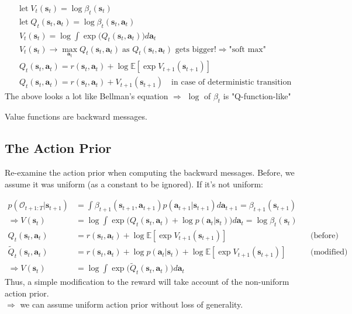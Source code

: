 \begin{align*}
	&\text{let}\; V_t(\textbf{s}_t) = \log \beta_t(\textbf{s}_t)\\
	&\text{let}\; Q_t(\textbf{s}_t, \textbf{a}_t) = \log \beta_t(\textbf{s}_t, \textbf{a}_t)\\
	&V_t(\textbf{s}_t) = \log \int \exp \big( Q_t(\textbf{s}_t, \textbf{a}_t) \big) d\textbf{a}_t\\
	&V_t(\textbf{s}_t) \rightarrow \underset{\textbf{a}_t}{\max} Q_t(\textbf{s}_t, \textbf{a}_t) \; \text{as $Q_t(\textbf{s}_t, \textbf{a}_t)$ gets bigger!} \Rightarrow \text{"soft max"}\\
	&Q_t(\textbf{s}_t, \textbf{a}_t) = r(\textbf{s}_t, \textbf{a}_t) + \log \mathbb{E} [\exp V_{t+1}(\textbf{s}_{t+1})]\\
	&Q_t(\textbf{s}_t, \textbf{a}_t) = r(\textbf{s}_t, \textbf{a}_t) + V_{t+1}(\textbf{s}_{t+1}) \quad \text{in case of deterministic transition}
\end{align*}
The above looks a lot like Bellman's equation $\Rightarrow$ $\log$ of $\beta_t$ is "Q-function-like"

\note Value functions are backward messages.

\subsection{The Action Prior}
Re-examine the action prior when computing the backward messages. Before, we assume it was uniform (as a constant to be ignored). If it's not uniform:

\begin{align}
	p(\mathcal{O}_{t+1:T}| \textbf{s}_{t+1}) &= \int \beta_{t+1} (\textbf{s}_{t+1}, \textbf{a}_{t+1}) p(\textbf{a}_{t+1} | \textbf{s}_{t+1}) d\textbf{a}_{t+1} = \beta_{t+1}(\textbf{s}_{t+1})\\
	\Rightarrow V(\textbf{s}_t) &= \log \int \exp \big( Q_t(\textbf{s}_t, \textbf{a}_t) + \log p(\textbf{a}_t | \textbf{s}_t) \big) d\textbf{a}_t = \log \beta_t(\textbf{s}_t) \\
	Q_t(\textbf{s}_t, \textbf{a}_t) &= r(\textbf{s}_t, \textbf{a}_t) + \log \mathbb{E} [\exp V_{t+1}(\textbf{s}_{t+1})] && \text{(before)}\\
	\widetilde{Q}_t(\textbf{s}_t, \textbf{a}_t) &= r(\textbf{s}_t, \textbf{a}_t) + \log p(\textbf{a}_t | \textbf{s}_t) + \log \mathbb{E} [\exp V_{t+1}(\textbf{s}_{t+1})] &&\text{(modified)}\\
	\Rightarrow V(\textbf{s}_t) &=  \log \int \exp \big( \widetilde{Q}_t(\textbf{s}_t, \textbf{a}_t)\big) d\textbf{a}_t
\end{align}
Thus, a simple modification to the reward will take account of the non-uniform action prior.\\
$\Rightarrow$ we can assume uniform action prior without loss of generality.

